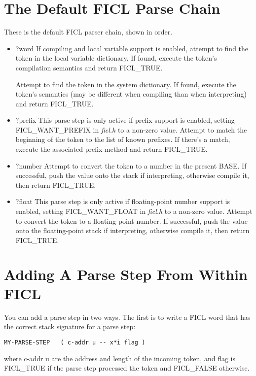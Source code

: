 \section{The Default FICL Parse Chain}
These is the default FICL parser chain, shown in order.
\begin{itemize}[noitemsep]
	\item ?word\newline
	If compiling and local variable support is enabled, attempt to
	find the token in the local variable dictionary. If found,
	execute the token's compilation semantics and return FICL\_TRUE.

	Attempt to find the token in the system dictionary. If found,
	execute the token's semantics (may be different when compiling
	than when interpreting) and return FICL\_TRUE.

	\item ?prefix\newline
	This parse step is only active if prefix support is enabled,
	setting FICL\_WANT\_PREFIX in \textit{ficl.h} to a non-zero
	value. Attempt to match the beginning of the token to the list
	of known prefixes. If there's a match, execute the associated
	prefix method and return FICL\_TRUE.

	\item ?number\newline
	Attempt to convert the token to a number in the present BASE. If
	successful, push the value onto the stack if interpreting,
	otherwise compile it, then return FICL\_TRUE.

	\item ?float\newline
	This parse step is only active if floating-point number support
	is enabled, setting FICL\_WANT\_FLOAT in \textit{ficl.h} to a
	non-zero value. Attempt to convert the token to a floating-point
	number. If successful, push the value onto the floating-point
	stack if interpreting, otherwise compile it, then return FICL\_TRUE.
\end{itemize}


\section{Adding A Parse Step From Within FICL}
You can add a parse step in two ways. The first is to write a FICL word
that has the correct stack signature for a parse step:
\begin{lstlisting}[frame=single]
MY-PARSE-STEP   ( c-addr u -- x*i flag )
\end{lstlisting}
where c-addr u are the address and length of the incoming token, and
flag is FICL\_TRUE if the parse step processed the token and FICL\_FALSE
otherwise.

